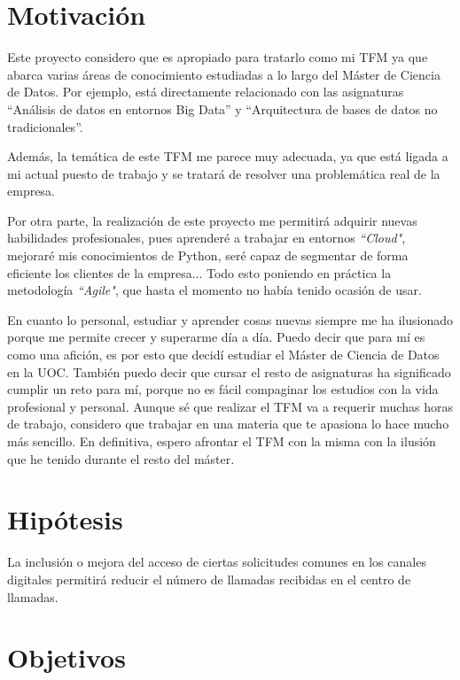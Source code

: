 \section{Motivación}

Este proyecto considero que es apropiado para tratarlo como mi TFM ya que abarca varias áreas de conocimiento estudiadas a lo largo del Máster de Ciencia de Datos. Por ejemplo, está directamente relacionado con las asignaturas “Análisis de datos en entornos Big Data” y “Arquitectura de bases de datos no tradicionales”. 

Además, la temática de este TFM me parece muy adecuada, ya que está ligada a mi actual puesto de trabajo y se tratará de resolver una problemática real de la empresa.  

Por otra parte, la realización de este proyecto me permitirá adquirir nuevas habilidades profesionales, pues aprenderé a trabajar en entornos \textit{``Cloud"}, mejoraré mis conocimientos de Python, seré capaz de segmentar de forma eficiente los clientes de la empresa... Todo esto poniendo en práctica la metodología \textit{``Agile"}, que hasta el momento no había tenido ocasión de usar. 

En cuanto lo personal, estudiar y aprender cosas nuevas siempre me ha ilusionado porque me permite crecer y superarme día a día. Puedo decir que para mí es como una afición, es por esto que decidí estudiar el Máster de Ciencia de Datos en la UOC. También puedo decir que cursar el resto de asignaturas ha significado cumplir un reto para mí, porque no es fácil compaginar los estudios con la vida profesional y personal. Aunque sé que realizar el TFM va a requerir muchas horas de trabajo, considero que trabajar en una materia que te apasiona lo hace mucho más sencillo. En definitiva, espero afrontar el TFM con la misma con la ilusión que he tenido durante el resto del máster.

\section{Hipótesis}

La inclusión o mejora del acceso de ciertas solicitudes comunes en los canales digitales permitirá reducir el número de llamadas recibidas en el centro de llamadas.


\section{Objetivos}

